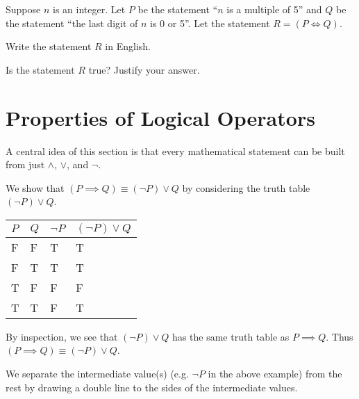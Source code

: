 \begin{exercise}
    Suppose $n$ is an integer. Let $P$ be the statement ``$n$ is a multiple of 5'' and $Q$ be the statement ``the last digit of $n$ is 0 or 5''. Let the statement $R = (P \iff Q)$.
    \begin{partquestions}{\roman*}
        \item Write the statement $R$ in English.
        \item Is the statement $R$ true? Justify your answer.
    \end{partquestions}
\end{exercise}

\section{Properties of Logical Operators}
A central idea of this section is that every mathematical statement can be built from just $\land$, $\lor$, and $\lnot$.

\begin{example}
    We show that $(P \implies Q) \equiv (\lnot P) \lor Q$ by considering the truth table $(\lnot P) \lor Q$.
    \begin{table}[h]
        \centering
        \begin{tabular}{|l|l||l||l|}
            \hline
            $P$ & $Q$ & $\lnot P$ & $(\lnot P) \lor Q$ \\ \hline
            F   & F   & T         & T                  \\ \hline
            F   & T   & T         & T                  \\ \hline
            T   & F   & F         & F                  \\ \hline
            T   & T   & F         & T                  \\ \hline
        \end{tabular}
    \end{table}

    \newpage
    
    By inspection, we see that $(\lnot P) \lor Q$ has the same truth table as $P \implies Q$. Thus $(P \implies Q) \equiv (\lnot P) \lor Q$.
\end{example}
\begin{remark}
    We separate the intermediate value(s) (e.g. $\lnot P$ in the above example) from the rest by drawing a double line to the sides of the intermediate values.
\end{remark}

